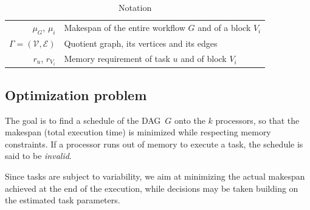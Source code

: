 \documentclass[conference]{IEEEtran}
\begin{document}
\begin{table}[h]
\begin{center}
\begin{tabular}{rl}
                $\mu_G$, $\mu_i$ & Makespan of the entire workflow $G$ and of a block $V_i$               \\
                $\Gamma = (\mathcal{V}, \mathcal{E})$                      & Quotient graph, its vertices and its edges        \\
                $r_u$, $r_{V_i}$                            & Memory requirement of task $u$ and of block $V_i$                 \\
                \hline
            \end{tabular}
        \end{center}
        \caption{Notation} \label{tabnotation}
    \end{table}



\subsection{Optimization problem}
\label{sec.mod.pb}

The goal is to find a schedule of the DAG~$G$ onto the $k$ processors,
so that the makespan (total execution time) is minimized while
respecting memory constraints. If a processor runs out of memory to execute
a task, the schedule is said to be {\em invalid}.

Since tasks are subject to variability, we aim at minimizing the actual makespan
achieved at the end of the execution, while decisions may be taken building
on the estimated task parameters.
\end{document}
